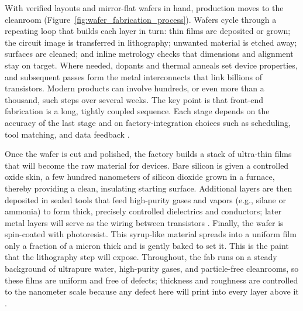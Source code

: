 With verified layouts and mirror-flat wafers in hand, production moves to the cleanroom (Figure~\ref{fig:wafer_fabrication_process}). Wafers cycle through a repeating loop that builds each layer in turn: thin films are deposited or grown; the circuit image is transferred in lithography; unwanted material is etched away; surfaces are cleaned; and inline metrology checks that dimensions and alignment stay on target. Where needed, dopants and thermal anneals set device properties, and subsequent passes form the metal interconnects that link billions of transistors. Modern products can involve hundreds, or even more than a thousand, such steps over several weeks. The key point is that front-end fabrication is a long, tightly coupled sequence. Each stage depends on the accuracy of the last stage and on factory-integration choices such as scheduling, tool matching, and data feedback \parencite{sze_physics_2007, van_zant_microchip_2014, irds_factory_integration_technical_working_group_international_2023, may_fundamentals_2006}.

Once the wafer is cut and polished, the factory builds a stack of ultra-thin films that will become the raw material for devices. Bare silicon is given a controlled oxide skin, a few hundred nanometers of silicon dioxide grown in a furnace, thereby providing a clean, insulating starting surface. Additional layers are then deposited in sealed tools that feed high-purity gases and vapors (e.g., silane or ammonia) to form thick, precisely controlled dielectrics and conductors; later metal layers will serve as the wiring between transistors \parencite{van_zant_microchip_2014,nishi_handbook_2007}. Finally, the wafer is spin-coated with photoresist. This syrup-like material spreads into a uniform film only a fraction of a micron thick and is gently baked to set it. This is the paint that the lithography step will expose. Throughout, the fab runs on a steady background of ultrapure water, high-purity gases, and particle-free cleanrooms, so these films are uniform and free of defects; thickness and roughness are controlled to the nanometer scale because any defect here will print into every layer above it \parencite{noauthor_iso_2015,van_zant_microchip_2014}.

